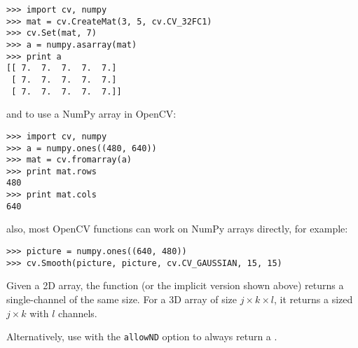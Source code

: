 \begin{lstlisting}
>>> import cv, numpy
>>> mat = cv.CreateMat(3, 5, cv.CV_32FC1)
>>> cv.Set(mat, 7)
>>> a = numpy.asarray(mat)
>>> print a
[[ 7.  7.  7.  7.  7.]
 [ 7.  7.  7.  7.  7.]
 [ 7.  7.  7.  7.  7.]]
\end{lstlisting}

and to use a NumPy array in OpenCV:

\begin{lstlisting}
>>> import cv, numpy
>>> a = numpy.ones((480, 640))
>>> mat = cv.fromarray(a)
>>> print mat.rows
480
>>> print mat.cols
640
\end{lstlisting}

also, most OpenCV functions can work on NumPy arrays directly, for example:

\begin{lstlisting}
>>> picture = numpy.ones((640, 480))
>>> cv.Smooth(picture, picture, cv.CV_GAUSSIAN, 15, 15)
\end{lstlisting}

Given a 2D array, 
the  function (or the implicit version shown above)
returns a single-channel  of the same size.
For a 3D array of size $j \times k \times l$, it returns a 
 sized $j \times k$ with $l$ channels.

Alternatively, use  with the \texttt{allowND} option to always return a .

\fi
